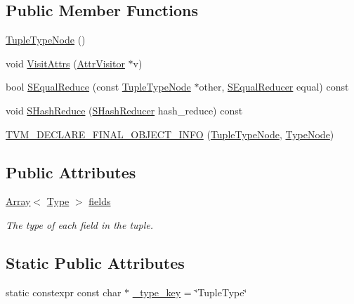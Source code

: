 \subsection*{Public Member Functions}
\begin{DoxyCompactItemize}
\item 
\hyperlink{classtvm_1_1TupleTypeNode_a1e9cbe8e91816366c181fb888ddc18d9}{Tuple\+Type\+Node} ()
\item 
void \hyperlink{classtvm_1_1TupleTypeNode_aeb1f655deb512dba884f6d5cb3ddc5e2}{Visit\+Attrs} (\hyperlink{classtvm_1_1AttrVisitor}{Attr\+Visitor} $\ast$v)
\item 
bool \hyperlink{classtvm_1_1TupleTypeNode_a4963057226e6818b281d4085cc7c0b67}{S\+Equal\+Reduce} (const \hyperlink{classtvm_1_1TupleTypeNode}{Tuple\+Type\+Node} $\ast$other, \hyperlink{classtvm_1_1SEqualReducer}{S\+Equal\+Reducer} equal) const 
\item 
void \hyperlink{classtvm_1_1TupleTypeNode_a9c9ef6b811b1a99ee2fae1edee774b74}{S\+Hash\+Reduce} (\hyperlink{classtvm_1_1SHashReducer}{S\+Hash\+Reducer} hash\+\_\+reduce) const 
\item 
\hyperlink{classtvm_1_1TupleTypeNode_ad1c04ffe90d786f2f18c0e8e0ae8d188}{T\+V\+M\+\_\+\+D\+E\+C\+L\+A\+R\+E\+\_\+\+F\+I\+N\+A\+L\+\_\+\+O\+B\+J\+E\+C\+T\+\_\+\+I\+N\+FO} (\hyperlink{classtvm_1_1TupleTypeNode}{Tuple\+Type\+Node}, \hyperlink{classtvm_1_1TypeNode}{Type\+Node})
\end{DoxyCompactItemize}
\subsection*{Public Attributes}
\begin{DoxyCompactItemize}
\item 
\hyperlink{classtvm_1_1Array}{Array}$<$ \hyperlink{classtvm_1_1Type}{Type} $>$ \hyperlink{classtvm_1_1TupleTypeNode_a2ac43b6c2f0f90ce64e8c3a213568021}{fields}
\begin{DoxyCompactList}\small\item\em The type of each field in the tuple. \end{DoxyCompactList}\end{DoxyCompactItemize}
\subsection*{Static Public Attributes}
\begin{DoxyCompactItemize}
\item 
static constexpr const char $\ast$ \hyperlink{classtvm_1_1TupleTypeNode_a2bbcc4fc888b49b6d78a3b123ac686ba}{\+\_\+type\+\_\+key} = \char`\"{}Tuple\+Type\char`\"{}
\end{DoxyCompactItemize}


